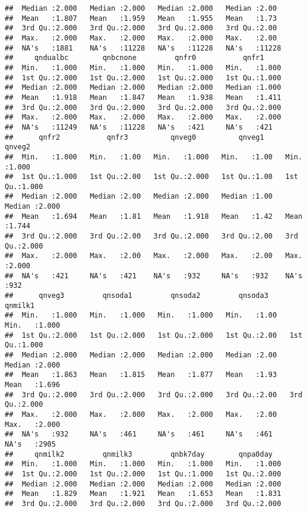 \documentclass[
]{article}
\begin{document}
\begin{verbatim}
##  Median :2.000   Median :2.000   Median :2.000   Median :2.00   
##  Mean   :1.807   Mean   :1.959   Mean   :1.955   Mean   :1.73   
##  3rd Qu.:2.000   3rd Qu.:2.000   3rd Qu.:2.000   3rd Qu.:2.00   
##  Max.   :2.000   Max.   :2.000   Max.   :2.000   Max.   :2.00   
##  NA's   :1881    NA's   :11228   NA's   :11228   NA's   :11228  
##     qndualbc        qnbcnone         qnfr0           qnfr1      
##  Min.   :1.000   Min.   :1.000   Min.   :1.000   Min.   :1.000  
##  1st Qu.:2.000   1st Qu.:2.000   1st Qu.:2.000   1st Qu.:1.000  
##  Median :2.000   Median :2.000   Median :2.000   Median :1.000  
##  Mean   :1.918   Mean   :1.847   Mean   :1.938   Mean   :1.411  
##  3rd Qu.:2.000   3rd Qu.:2.000   3rd Qu.:2.000   3rd Qu.:2.000  
##  Max.   :2.000   Max.   :2.000   Max.   :2.000   Max.   :2.000  
##  NA's   :11249   NA's   :11228   NA's   :421     NA's   :421    
##      qnfr2           qnfr3          qnveg0          qnveg1         qnveg2     
##  Min.   :1.000   Min.   :1.00   Min.   :1.000   Min.   :1.00   Min.   :1.000  
##  1st Qu.:1.000   1st Qu.:2.00   1st Qu.:2.000   1st Qu.:1.00   1st Qu.:1.000  
##  Median :2.000   Median :2.00   Median :2.000   Median :1.00   Median :2.000  
##  Mean   :1.694   Mean   :1.81   Mean   :1.918   Mean   :1.42   Mean   :1.744  
##  3rd Qu.:2.000   3rd Qu.:2.00   3rd Qu.:2.000   3rd Qu.:2.00   3rd Qu.:2.000  
##  Max.   :2.000   Max.   :2.00   Max.   :2.000   Max.   :2.00   Max.   :2.000  
##  NA's   :421     NA's   :421    NA's   :932     NA's   :932    NA's   :932    
##      qnveg3         qnsoda1         qnsoda2         qnsoda3        qnmilk1     
##  Min.   :1.000   Min.   :1.000   Min.   :1.000   Min.   :1.00   Min.   :1.000  
##  1st Qu.:2.000   1st Qu.:2.000   1st Qu.:2.000   1st Qu.:2.00   1st Qu.:1.000  
##  Median :2.000   Median :2.000   Median :2.000   Median :2.00   Median :2.000  
##  Mean   :1.863   Mean   :1.815   Mean   :1.877   Mean   :1.93   Mean   :1.696  
##  3rd Qu.:2.000   3rd Qu.:2.000   3rd Qu.:2.000   3rd Qu.:2.00   3rd Qu.:2.000  
##  Max.   :2.000   Max.   :2.000   Max.   :2.000   Max.   :2.00   Max.   :2.000  
##  NA's   :932     NA's   :461     NA's   :461     NA's   :461    NA's   :2905   
##     qnmilk2         qnmilk3         qnbk7day        qnpa0day    
##  Min.   :1.000   Min.   :1.000   Min.   :1.000   Min.   :1.000  
##  1st Qu.:2.000   1st Qu.:2.000   1st Qu.:1.000   1st Qu.:2.000  
##  Median :2.000   Median :2.000   Median :2.000   Median :2.000  
##  Mean   :1.829   Mean   :1.921   Mean   :1.653   Mean   :1.831  
##  3rd Qu.:2.000   3rd Qu.:2.000   3rd Qu.:2.000   3rd Qu.:2.000  

\end{verbatim}
\end{document}
